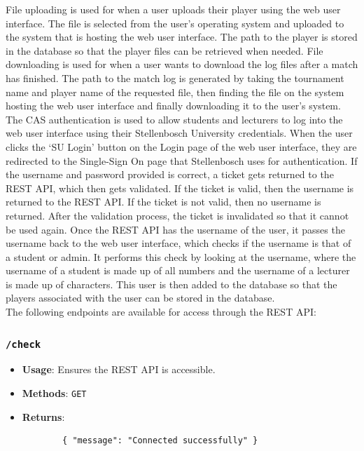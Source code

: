 \documentclass[a4paper, 12pt]{report}
\begin{document}
File uploading is used for when a user uploads their player using the web user
interface. The file is selected from the user's operating system and uploaded
to the system that is hosting the web user interface. The path to the player
is stored in the database so that the player files can be retrieved when needed.
File downloading is used for when a user wants to download the log files after
a match has finished. The path to the match log is generated by taking the
tournament name and player name of the requested file, then finding the file on
the system hosting the web user interface and finally downloading it to the user's
system. \\

The CAS authentication is used to allow students and lecturers to log into the
web user interface using their Stellenbosch University credentials. When the
user clicks the `SU Login' button on the Login page of the web user interface,
they are redirected to the Single-Sign On page that Stellenbosch uses for
authentication. If the username and password provided is correct, a ticket gets
returned to the REST API, which then gets validated. If the ticket is valid, then
the username is returned to the REST API. If the ticket is not valid, then no
username is returned. After the validation process, the ticket is invalidated so
that it cannot be used again. Once the REST API has the username of the user,
it passes the username back to the web user interface, which checks if the username
is that of a student or admin. It performs this check by looking at the username,
where the username of a student is made up of all numbers and the username of
a lecturer is made up of characters. This user is then added to the database so
that the players associated with the user can be stored in the database. \\

The following endpoints are available for access through the REST API:
\subsubsection*{\texttt{/check}}
\begin{itemize}
	\item \textbf{Usage}: Ensures the REST API is accessible.
	\item \textbf{Methods}: \texttt{GET}
	\item \textbf{Returns}:
	\begin{verbatim}
		{ "message": "Connected successfully" }
	\end{verbatim}
\end{itemize}
\end{document}
